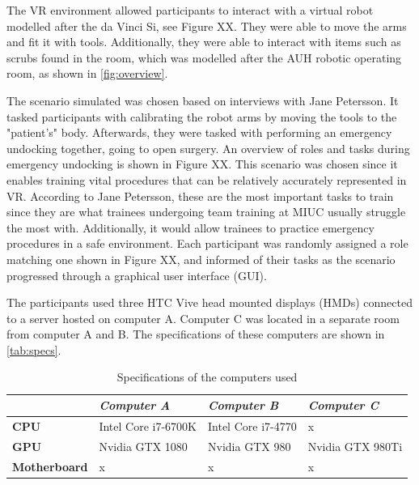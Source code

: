 \documentclass[conference]{IEEEtran}
\begin{document}
The VR environment allowed participants to interact with a virtual robot modelled after the da Vinci Si, see Figure XX. They were able to move the arms and fit it with tools. Additionally, they were able to interact with items such as scrubs found in the room, which was modelled after the AUH robotic operating room, as shown in \autoref{fig:overview}.


The scenario simulated was chosen based on interviews with Jane Petersson. It tasked participants with calibrating the robot arms by moving the tools to the "patient's" body. Afterwards, they were tasked with performing an emergency undocking together, going to open surgery. An overview of roles and tasks during emergency undocking is shown in Figure XX. This scenario was chosen since it enables training vital procedures that can be relatively accurately represented in VR. According to Jane Petersson, these are the most important tasks to train since they are what trainees undergoing team training at MIUC usually struggle the most with. Additionally, it would allow trainees to practice emergency procedures in a safe environment. Each participant was randomly assigned a role matching one shown in Figure XX, and informed of their tasks as the scenario progressed through a graphical user interface (GUI).

The participants used three HTC Vive head mounted displays (HMDs) connected to a server hosted on computer A. Computer C was located in a separate room from computer A and B. The specifications of these computers are shown in \autoref{tab:specs}. 

\begin{table}[H]
\centering
\begin{tabularx}{0.48\textwidth}{X X X X}
\toprule
                     & \textit{Computer A} & \textit{Computer B} & \textit{Computer C} \\ \midrule \rowcolor{lightGrey}
\textbf{CPU}         & Intel Core i7-6700K & Intel Core i7-4770  & x                   \\

\textbf{GPU}         & Nvidia GTX 1080     & Nvidia GTX 980      & Nvidia GTX 980Ti    \\  \rowcolor{lightGrey}

\textbf{Motherboard} & x                   & x                   & x                   \\ \toprule
\end{tabularx}
\caption{Specifications of the computers used}
\label{tab:specs}
\end{table}
\end{document}
